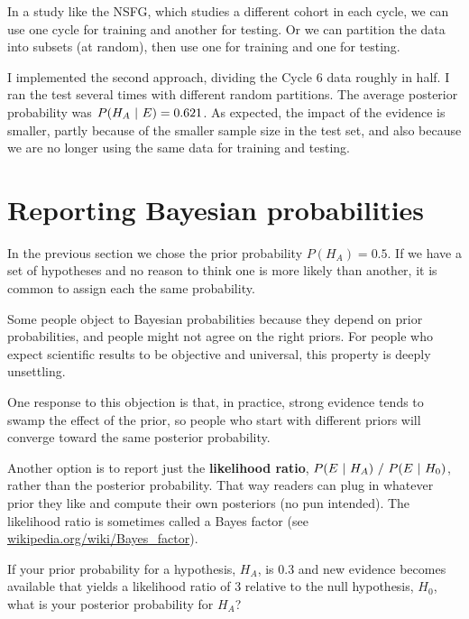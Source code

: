 \documentclass[12pt]{book}
\begin{document}
In a study like the NSFG, which studies a different cohort in each
cycle, we can use one cycle for training and another for testing.
Or we can partition the data into subsets (at random), then use
one for training and one for testing.


I implemented the second approach, dividing the Cycle 6 data roughly
in half.  I ran the test several times with different random partitions.
The average posterior probability was $P(H_A ~|~ E) = 0.621$.  As
expected, the impact of the evidence is smaller, partly because of
the smaller sample size in the test set, and also because we are
no longer using the same data for training and testing.



\section{Reporting Bayesian probabilities}

In the previous section we chose the prior probability $P(H_A) = 0.5$.
If we have a set of hypotheses and no reason to think one is more
likely than another, it is common to assign each the same probability.

Some people object to Bayesian probabilities because they depend on
prior probabilities, and people might not agree on
the right priors.  For people who expect scientific results to be
objective and universal, this property is deeply unsettling.


One response to this objection is that, in practice, strong evidence
tends to swamp the effect of the prior, so people who start with
different priors will converge toward the same posterior
probability.


Another option is to report just the {\bf likelihood ratio}, 
$P(E ~|~ H_A) ~/~ P(E ~|~ H_0)$, rather than the posterior probability.  That way
readers can plug in whatever prior they like and compute their own
posteriors (no pun intended).  The likelihood ratio is sometimes
called a Bayes factor (see \url{wikipedia.org/wiki/Bayes_factor}).

\begin{exercise}
If your prior probability for a hypothesis, $H_A$, is 0.3 and new
evidence becomes available that yields a likelihood ratio of 3
relative to the null hypothesis, $H_0$, what is your posterior
probability for $H_A$?



\end{exercise}
\end{document}
